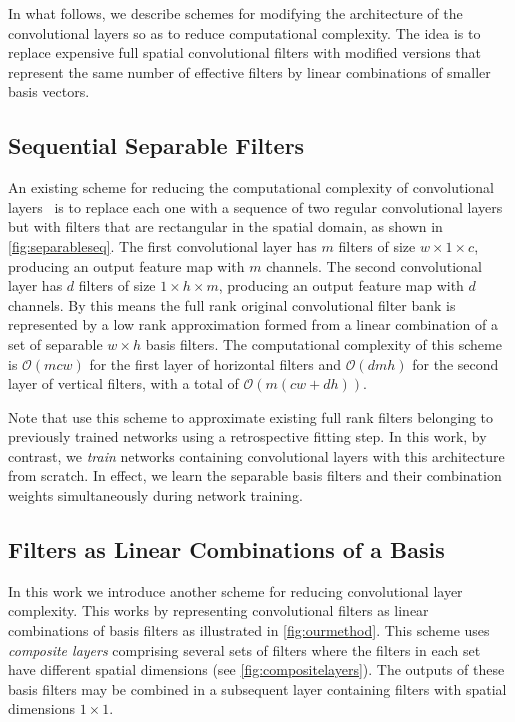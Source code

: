 \documentclass[thesis]{subfiles}
\begin{document}
    In what follows, we describe schemes for modifying the architecture of the convolutional layers so as to reduce computational complexity. The idea is to replace expensive full spatial convolutional filters with modified versions that represent the same number of effective filters by linear combinations of smaller basis vectors. 
    
    \subsection{Sequential Separable Filters}\label{seqsep}
    An existing scheme for reducing the computational complexity of convolutional layers~\citep{journals/corr/JaderbergVZ14} is to replace each one with a sequence of two regular convolutional layers but with filters that are rectangular in the spatial domain, as shown in \cref{fig:separableseq}. The first convolutional layer has $m$ filters of size $w \times 1 \times c$, producing an output feature map with $m$ channels. The second convolutional layer has $d$ filters of size $1 \times h \times m$, producing an output feature map with $d$ channels. By this means the full rank original convolutional filter bank is represented by a low rank approximation formed from a linear combination of a set of separable $w \times h$ basis filters.  The computational complexity of this scheme is $\mathcal{O}(m c w)$ for the first layer of horizontal filters and $\mathcal{O}(d m h)$ for the second layer of vertical filters, with a total of $\mathcal{O}(m(c w + d h))$.
    
    Note that \citet{journals/corr/JaderbergVZ14} use this scheme to approximate existing full rank filters belonging to previously trained networks using a retrospective fitting step. In this work, by contrast,  we {\em train} networks containing convolutional layers with this architecture from scratch. In effect, we learn the separable basis filters and their combination weights simultaneously during network training.
    
    
    \subsection{Filters as Linear Combinations of a Basis}
    In this work we introduce another scheme for reducing convolutional layer complexity. This works by representing convolutional filters as linear combinations of basis filters as illustrated in \cref{fig:ourmethod}. This scheme uses \emph{composite layers} comprising several sets of filters where the filters in each set have different spatial dimensions (see \cref{fig:compositelayers}). The outputs of these basis filters may be combined in a subsequent layer containing filters with spatial dimensions $1 \times 1$.
    
\end{document}
